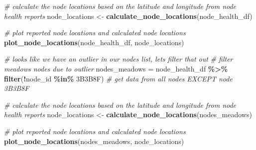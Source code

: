 \documentclass[
]{book}
\newenvironment{Shaded}{\begin{snugshade}}{\end{snugshade}}
\newcommand{\CommentTok}[1]{\textcolor[rgb]{0.56,0.35,0.01}{\textit{#1}}}
\newcommand{\FunctionTok}[1]{\textcolor[rgb]{0.13,0.29,0.53}{\textbf{#1}}}
\newcommand{\NormalTok}[1]{#1}
\newcommand{\OtherTok}[1]{\textcolor[rgb]{0.56,0.35,0.01}{#1}}
\newcommand{\SpecialCharTok}[1]{\textcolor[rgb]{0.81,0.36,0.00}{\textbf{#1}}}
\newcommand{\StringTok}[1]{\textcolor[rgb]{0.31,0.60,0.02}{#1}}
\begin{document}
\begin{Shaded}
\begin{Highlighting}[]
\CommentTok{\# calculate the node locations based on the latitude and longitude from node health reports}
\NormalTok{node\_locations }\OtherTok{\textless{}{-}} \FunctionTok{calculate\_node\_locations}\NormalTok{(node\_health\_df)}

\CommentTok{\# plot reported node locations and calculated node locations}
\FunctionTok{plot\_node\_locations}\NormalTok{(node\_health\_df, node\_locations)}

\CommentTok{\# looks like we have an outlier in our nodes list, let\textquotesingle{}s filter that out}
\CommentTok{\# filter meadows nodes due to outlier}
\NormalTok{nodes\_meadows }\OtherTok{=}\NormalTok{ node\_health\_df }\SpecialCharTok{\%\textgreater{}\%}
  \FunctionTok{filter}\NormalTok{(}\SpecialCharTok{!}\NormalTok{node\_id }\SpecialCharTok{\%in\%} \StringTok{\textquotesingle{}3B3B8F\textquotesingle{}}\NormalTok{) }\CommentTok{\# get data from all nodes EXCEPT node 3B3B8F}

\CommentTok{\# calculate the node locations based on the latitude and longitude from node health reports}
\NormalTok{node\_locations }\OtherTok{\textless{}{-}} \FunctionTok{calculate\_node\_locations}\NormalTok{(nodes\_meadows)}

\CommentTok{\# plot reported node locations and calculated node locations}
\FunctionTok{plot\_node\_locations}\NormalTok{(nodes\_meadows, node\_locations)}
\end{Highlighting}
\end{Shaded}
\end{document}
